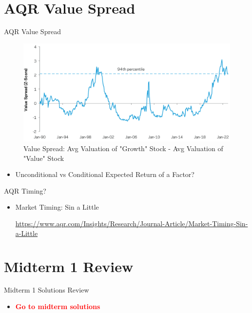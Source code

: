 \documentclass{beamer}
\newcommand{\highlightred}[1]{\textcolor{red}{\textbf{#1}}}
\begin{document}
\section{AQR Value Spread}
\begin{frame}{AQR Value Spread}
    \begin{figure}[h]
    \centering
        \includegraphics[width=1\textwidth]{value_spread.png}
        \caption{Value Spread: Avg Valuation of "Growth" Stock - Avg Valuation of "Value" Stock}
        \label{fig:sample_image}
    \end{figure}
    \begin{itemize}
        \item Unconditional vs Conditional Expected Return of a Factor?
    \end{itemize}
\end{frame}

\begin{frame}{AQR Timing?}
    \begin{itemize}
        \item Market Timing: Sin a Little
        
        \url{https://www.aqr.com/Insights/Research/Journal-Article/Market-Timing-Sin-a-Little}
    \end{itemize}
\end{frame}

\section{Midterm 1 Review}
\begin{frame}{Midterm 1 Solutions Review}
    \begin{itemize}
        \item \highlightred{Go to midterm solutions}
    \end{itemize}
\end{frame}
\end{document}

